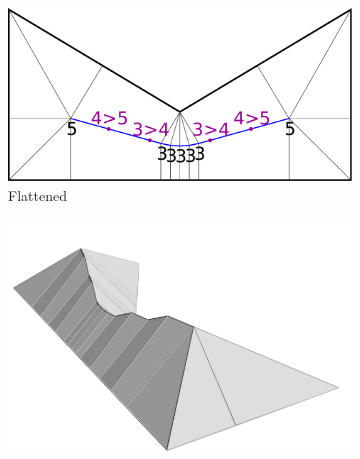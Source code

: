 \begin{figure}
\begin{subfigure}{\figwidth}
\includegraphics[width=\figwidthTwo]{sources/method/surface/rounded.pdf}
\caption{Flattened}\label{3d_surface_overview_rounded}
\end{subfigure}
\begin{subfigure}{\figwidth}\centering
\hspace*{\tempheightTwo}
\includegraphics[width=\figwidthTree]{sources/method/surface/smoothed_cropped.png}

\vspace{\tempheight}


\end{subfigure}
\end{figure}
